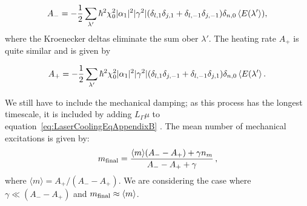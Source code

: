 \documentclass[reprint, amsmath,amssymb, aps,pra]{revtex4-1}
\begin{document}
\begin{equation}
A_- = - \frac{1}{2}\sum_{\lambda'}\hbar^2\chi_0^2 |\alpha_1|^2 |\gamma^2|(\delta_{l,1}\delta_{j,1}+\delta_{l,-1}\delta_{j,-1})\delta_{n,0}\expval{E(\lambda'}),
\end{equation} where the Kroenecker deltas eliminate the sum ober $\lambda'$. The heating rate $A_+$ is quite similar and is given by

\begin{equation}
A_+ = - \frac{1}{2}\sum_{\lambda'}\hbar^2\chi_0^2 |\alpha_1|^2 |\gamma^2|(\delta_{l,1}\delta_{j,-1}+\delta_{l,-1}\delta_{j,1})\delta_{n,0}\expval{E(\lambda'}.
\end{equation}

We still have to include the mechanical damping; as this process has
the longest timescale, it is included by adding $L_\Gamma \mu$ to
equation~\eqref{eq:LaserCoolingEqAppendixB} \cite{BarberisLC}. The
mean number of mechanical excitations is given by:
\begin{equation}
  \label{eq:finalm}
   m_{\rm final} =\frac{\langle m \rangle
    (A_--A_+)+\gamma n_m}{A_--A_++\gamma}\, ,
\end{equation}
where $\langle m \rangle=A_+/(A_--A_+)$. We are considering the case
where $\gamma \ll (A_--A_+)$ and
$ m_{\rm final}\approx \langle m \rangle$.





\end{document}
